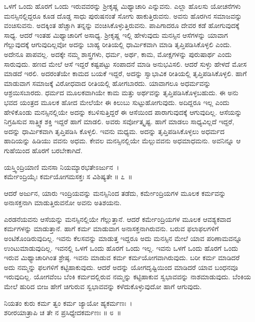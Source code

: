 ಒಳಗೆ ಒಂದು ಹೊರಗೆ ಒಂದು ಇರುವವರನ್ನು ಶ‍್ರೀಕೃಷ್ಣ ಮಿಥ್ಯಾಚಾರಿ ಎನ್ನುವನು. ಎಲ್ಲಾ ಹೊಲಸು ಯೋಚನೆಗಳು ಮನಸ್ಸಿನಲ್ಲಿದ್ದರೂ ಕೂಡ ದೊಡ್ಡ ಸಾಧು ಪುರುಷನಂತೆ ಸೋಗು ಹಾಕುತ್ತಿರುವನು. ಅವನು ಹೊರಗಿನ ಸಮಾಜವನ್ನು ವಂಚಿಸುವನು. ಅದಕ್ಕಿಂತ ಹೆಚ್ಚಾಗಿ ತನ್ನನ್ನು ವಂಚಿಸಿಕೊಳ್ಳುತ್ತಿರುವನು. ಪಾಪಿಗಾದರೂ ದೇವರ ಕಡೆ ಹೋಗುವುದಕ್ಕೆ ಸಾಧ್ಯ. ಆದರೆ ಇಂತಹ ಮಿಥ್ಯಾಚಾರಿಗೆ ಅಸಾಧ್ಯ. ಶ‍್ರೀಕೃಷ್ಣ ಇಲ್ಲಿ ಹೇಳುವುದು ಮನಸ್ಸಿನ ಆಸೆಗಳನ್ನು ಯಾವಾಗ ಗೆಲ್ಲುವುದಕ್ಕೆ ಆಗುವುದಿಲ್ಲವೋ ಅದನ್ನು ಬಾಹ್ಯ ರೀತಿಯಲ್ಲಿ ಧಾರ್ಮಿಕವಾಗಿ ಮಾಡಿ ತೃಪ್ತಿಪಡಿಸಿಕೊಳ್ಳಲಿ ಎಂದು. ಅದೇನೂ ಪಾಪವಲ್ಲ. ಅದಕ್ಕೇ ನಮ್ಮ ಶಾಸ್ತ್ರಗಳು, ಧರ್ಮ, ಅರ್ಥ, ಕಾಮ, ಮೋಕ್ಷಗಳನ್ನು ಪುರುಷಾರ್ಥ ಎಂದು ಸಾರುವುದು. ಹಣದ ಮೇಲೆ ಆಸೆ ಇದ್ದರೆ ಕಷ್ಟಪಟ್ಟು ಸಂಪಾದನೆ ಮಾಡಿ ಅನುಭವಿಸಲಿ. ಆದರೆ ಸುಳ್ಳು ಹೇಳದೆ ಮೋಸ ಮಾಡದೆ ಇರಲಿ. ಅದರಂತೆಯೇ ಕಾಮದ ಬಯಕೆ ಇದ್ದರೆ, ಅದನ್ನು ಸ್ವಾಭಾವಿಕ ರೀತಿಯಲ್ಲಿ ತೃಪ್ತಿಪಡಿಸಿಕೊಳ್ಳಲಿ. ಹಾಗೆ ಮಾಡುವಾಗ ಸಮಾಜಕ್ಕೆ ವಿರೋಧವಾದ ರೀತಿಯಲ್ಲಿ ಹೋಗಬಾರದು. ಯಾವಾಗಲೂ ಅಧರ್ಮವನ್ನು ಆಶ್ರಯಿಸಬಾರದು. ಧರ್ಮದ ಮೂಲಕವಾಗಿಯೇ ಕಾಮ ಮತ್ತು ಅರ್ಥವನ್ನು ತೃಪ್ತಿಪಡಿಸಿಕೊಳ್ಳಬಹುದು. ಈ ಅನು ಭವದ ಯಂತ್ರದ ಮೂಲಕ ಹೋದ ಮೇಲೆಯೇ ಈ ಕಿಲುಬು ಸುಟ್ಟುಹೋಗುವುದು. ಅದಿದ್ದರೂ ಇಲ್ಲ ಎಂದು ಹೇಳಿಕೊಂಡು ಮನಸ್ಸಿನಲ್ಲಿಯೇ ಅದನ್ನು ಕಬಳಿಸುತ್ತಿದ್ದರೆ ಈ ಆಸೆಯಿಂದ ಪಾರಾಗುವುದಕ್ಕೆ ಆಗುವುದಿಲ್ಲ. ಆಸೆಯನ್ನು ನಿಗ್ರಹಿಸುವ ಸಾತ್ತ್ವಿಕ ಶಕ್ತಿ ಇದ್ದರೆ ಹಾಗೆ ಮಾಡಲಿ. ಅವರು ಸರ್ವೋತ್ಕೃಷ್ಟ. ಹಾಗೆ ಮಾಡಲು ಸಾಧ್ಯವಿಲ್ಲದೆ ಇದ್ದರೆ, ಅದನ್ನು ಧಾರ್ಮಿಕವಾಗಿ ತೃಪ್ತಿಪಡಿಸಿ ಕೊಳ್ಳಲಿ. ಇವನು ಮಧ್ಯಮ. ಅದನ್ನು ತೃಪ್ತಿಪಡಿಸಿಕೊಳ್ಳಲು ಅಧರ್ಮದ ಹಾದಿಯನ್ನು ಹಿಡಿಯು ವವನು ಅಧಮ. ಕೇವಲ ಮನಸ್ಸಿ\-ನಲ್ಲಿಯೇ ಮೆಲ್ಲುವವನು ಅಧಮಾಧಮನು. ಅವನಿನ್ನೂ ಆ ಗುಹೆಯಿಂದ ಹೊರಗೆ ಬರಬೇಕಾಗಿದೆ.

\begin{shloka}
ಯಸ್ತ್ವಿಂದ್ರಿಯಾಣಿ ಮನಸಾ ನಿಯಮ್ಯಾರಭತೇಽರ್ಜುನ~।\\ಕರ್ಮೇಂದ್ರಿಯೈಃ ಕರ್ಮಯೋಗಮಸಕ್ತಃ ಸ ವಿಶಿಷ್ಯತೇ \hfill॥ ೭~॥
\end{shloka}

\begin{artha}
ಆದರೆ ಅರ್ಜುನ, ಯಾರು ಇಂದ್ರಿಯವನ್ನು ಮನಸ್ಸಿನಿಂದ ತಡೆದು, ಕರ್ಮೇಂದ್ರಿಯಗಳ ಮೂಲಕ ಕರ್ಮವನ್ನು ಅನಾಸಕ್ತನಾಗಿ ಮಾಡುತ್ತಿರುವನೋ ಅವನು ಅತಿಶಯನು.
\end{artha}

ಎರಡನೆಯವನು ಆಸೆಯನ್ನು ಮನಸ್ಸಿನಲ್ಲಿಯೇ ಗೆಲ್ಲುತ್ತಾನೆ. ಆದರೆ ಕರ್ಮೇಂದ್ರಿಯಗಳ ಮೂಲಕ ಆವಶ್ಯಕವಾದ ಕರ್ಮಗಳನ್ನು ಮಾಡುತ್ತಾನೆ. ಹಾಗೆ ಕರ್ಮ ಮಾಡುವಾಗ ಅನಾಸಕ್ತನಾಗಿರುವನು. ಬರುವ ಫಲಾಫಲಗಳಿಗೆ ಅಂಟಿಕೊಂಡಿರುವುದಿಲ್ಲ. ಇವನು ಕೆಲಸವನ್ನು ಮಾಡುತ್ತ ಇದ್ದರೂ ಅದು ಮನಸ್ಸಿನ ಮೇಲೆ ಯಾವ ಪರಿಣಾಮವನ್ನೂ ಉಂಟುಮಾಡುವುದಿಲ್ಲ. ಇವನಲ್ಲಿ ಒಳಗೆ ಒಂದು ಹೊರಗೆ ಒಂದು ಇಲ್ಲ. ಇವನು ಒಳಗೆ ಒಂದು ಹೊರಗೆ ಒಂದು ಇರುವ ಮಿಥ್ಯಾಚಾರಿಗಿಂತ ಶ್ರೇಷ್ಠ. ಇವನು ಮಾಡುವ ಕರ್ಮ ಕರ್ಮಯೋಗವಾಗಿರುವುದು. ಬರೀ ಕರ್ಮ ಮಾಡಿದರೆ ಅದು ನಮ್ಮನ್ನು ಫಲಗಳಿಗೆ ಕಟ್ಟಿಹಾಕುವುದು. ಆದರೆ ಅದನ್ನು ಯೋಗದೃಷ್ಟಿಯಿಂದ ಮಾಡಿದರೆ ಯಾವ ಬಂಧನವೂ ಇರುವುದಿಲ್ಲ. ಯೋಗವೆಂಬ ಬೆಂಕಿ ಕರ್ಮದಲ್ಲಿರುವ ನಮ್ಮನ್ನು ಕಟ್ಟಿಹಾಕುವ ಸ್ವಭಾವವನ್ನು ನಾಶಮಾಡುವುದು. ಬೆಂಕಿಯ ಮೇಲೆ ಹುರಿದ ಬೀಜ ಹೇಗೆ ಚಿಗುರುವ ಸ್ವಭಾವವನ್ನು ಕಳೆದುಕೊಳ್ಳುವುದೋ ಹಾಗೆ ಆಗುವುದು.

\begin{shloka}
ನಿಯತಂ ಕುರು ಕರ್ಮ ತ್ವಂ ಕರ್ಮ ಜ್ಯಾಯೋ ಹ್ಯಕರ್ಮಣಃ~।\\ಶರೀರಯಾತ್ರಾಪಿ ಚ ತೇ ನ ಪ್ರಸಿಧ್ಯೇದಕರ್ಮಣಃ \hfill॥ ೮~॥
\end{shloka}

